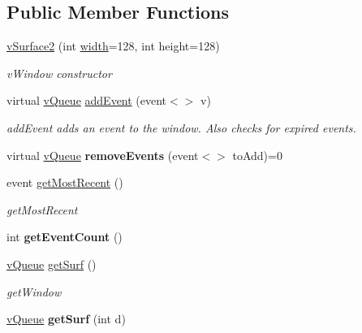 \subsection*{Public Member Functions}
\begin{DoxyCompactItemize}
\item 
\hyperlink{classev_1_1vSurface2_ada6aeb852479aa111b1f5ad32ac1286b}{v\+Surface2} (int \hyperlink{classev_1_1vSurface2_a1aa8027816352a15d5b9bf1f26f48e76}{width}=128, int height=128)
\begin{DoxyCompactList}\small\item\em v\+Window constructor \end{DoxyCompactList}\item 
virtual \hyperlink{classev_1_1vQueue}{v\+Queue} \hyperlink{classev_1_1vSurface2_a6dee662976048b73d7b19e45871352da}{add\+Event} (event$<$$>$ v)
\begin{DoxyCompactList}\small\item\em add\+Event adds an event to the window. Also checks for expired events. \end{DoxyCompactList}\item 
virtual \hyperlink{classev_1_1vQueue}{v\+Queue} {\bfseries remove\+Events} (event$<$$>$ to\+Add)=0\hypertarget{classev_1_1vSurface2_af35870c14a5c94dc7522bdfcf76df2cb}{}\label{classev_1_1vSurface2_af35870c14a5c94dc7522bdfcf76df2cb}

\item 
event \hyperlink{classev_1_1vSurface2_af84a860e057aea43831e8e6d16107cd4}{get\+Most\+Recent} ()
\begin{DoxyCompactList}\small\item\em get\+Most\+Recent \end{DoxyCompactList}\item 
int {\bfseries get\+Event\+Count} ()\hypertarget{classev_1_1vSurface2_a67906f1ecd7fab30f1d0f7218388234e}{}\label{classev_1_1vSurface2_a67906f1ecd7fab30f1d0f7218388234e}

\item 
\hyperlink{classev_1_1vQueue}{v\+Queue} \hyperlink{classev_1_1vSurface2_aedcc28d0ccdbc343f031506a8fa84bb0}{get\+Surf} ()
\begin{DoxyCompactList}\small\item\em get\+Window \end{DoxyCompactList}\item 
\hyperlink{classev_1_1vQueue}{v\+Queue} {\bfseries get\+Surf} (int d)\hypertarget{classev_1_1vSurface2_aaa5978b3d040e278db563495585adf86}{}\label{classev_1_1vSurface2_aaa5978b3d040e278db563495585adf86}


\end{DoxyCompactItemize}
